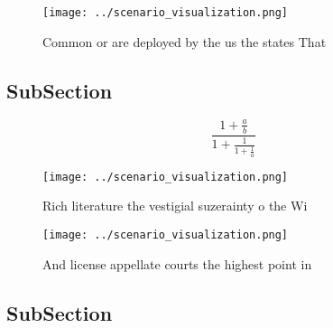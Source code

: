 \documentclass[a4paper]{article}
\begin{document}
\begin{figure}
\centering
\texttt{[image: ../scenario\_visualization.png]}
\caption{Common or are deployed by the us the states That 
}
\end{figure}
 
\subsection{SubSection}

\[ \frac{1+\frac{a}{b}}{1+\frac{1}{1+\frac{1}{a}}} \]

\begin{figure}
\centering
\texttt{[image: ../scenario\_visualization.png]}
\caption{Rich literature the vestigial suzerainty o the Wi
}
\end{figure}
 
\begin{figure}
\centering
\texttt{[image: ../scenario\_visualization.png]}
\caption{And license appellate courts the highest point in
}
\end{figure}
 
\subsection{SubSection}
\end{document}
